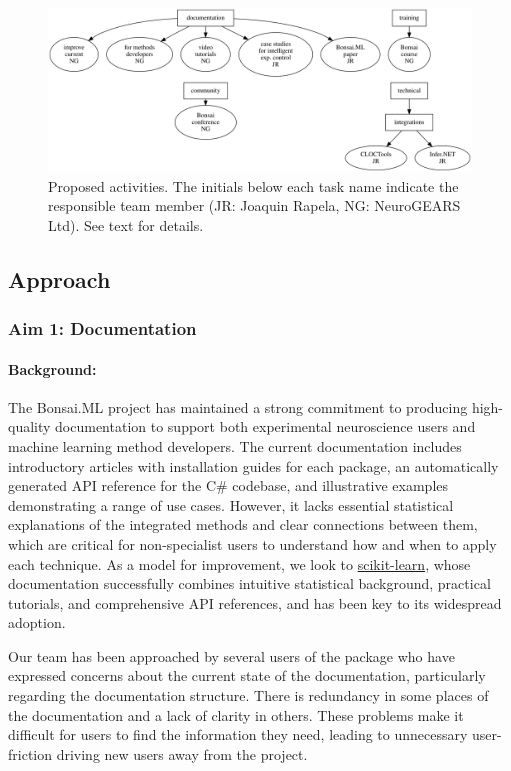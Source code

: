 
\begin{figure}
    \centering
    \includegraphics[width=6in]{activitiesGraphs/activities_larger.png}

    \caption{Proposed activities. The initials below each task name indicate
    the responsible team member (JR: Joaquin Rapela, NG: NeuroGEARS Ltd). See
    text for details.}

\end{figure}

\subsection{Approach}

\subsubsection{Aim 1: Documentation}

\paragraph{Background:} The Bonsai.ML project has maintained a strong
commitment to producing high-quality documentation to support both experimental
neuroscience users and machine learning method developers. The current
documentation includes introductory articles with installation guides for each
package, an automatically generated API reference for the C\# codebase, and
illustrative examples demonstrating a range of use cases. However, it lacks
essential statistical explanations of the integrated methods and clear
connections between them, which are critical for non-specialist users to
understand how and when to apply each technique. As a model for improvement, we
look to \href{https://scikit-learn.org/}{scikit-learn}, whose documentation
successfully combines intuitive statistical background, practical tutorials,
and comprehensive API references, and has been key to its widespread adoption.


Our team has been approached by several users of the package who have expressed
concerns about the current state of the documentation, particularly regarding
the documentation structure.  There is redundancy in some places of the
documentation and a lack of clarity in others.
%
These problems make it difficult for users to find the information they need,
leading to unnecessary user-friction driving new users away from the project.

